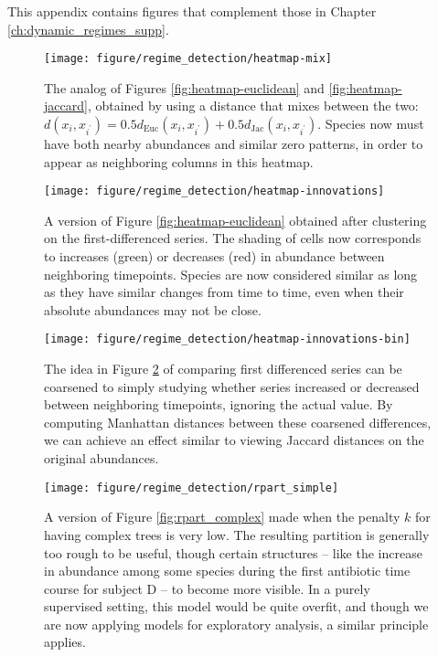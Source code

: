 This appendix contains figures that complement those in Chapter
\ref{ch:dynamic_regimes_supp}.

\begin{figure}
  \centering
  \texttt{[image: figure/regime\_detection/heatmap-mix]}
  \caption{
    The analog of Figures \ref{fig:heatmap-euclidean} and
    \ref{fig:heatmap-jaccard}, obtained by using a distance that mixes between
    the two: $d\left(x_i, x_{i^{\prime}}\right) = 0.5 d_{\text{Euc}}\left(x_{i},
    x_{i^{\prime}}\right) + 0.5d_{\text{Jac}}\left(x_{i}, x_{i^\prime}\right)$.
    Species now must have both nearby abundances and similar zero patterns, in
    order to appear as neighboring columns in this heatmap.
    \label{fig:heatmap-mix} }
\end{figure}

\begin{figure}
  \centering
  \texttt{[image: figure/regime\_detection/heatmap-innovations]}
  \caption{
    A version of Figure \ref{fig:heatmap-euclidean} obtained after clustering on
    the first-differenced series. The shading of cells now corresponds to
    increases (green) or decreases (red) in abundance between neighboring
    timepoints. Species are now considered similar as long as they have similar
    changes from time to time, even when their absolute abundances may not be
    close.
    \label{fig:heatmap-innovations} }
\end{figure}

\begin{figure}
  \centering
  \texttt{[image: figure/regime\_detection/heatmap-innovations-bin]}
  \caption{
    The idea in Figure \ref{fig:heatmap-innovations} of comparing first
    differenced series can be coarsened to simply studying whether series
    increased or decreased between neighboring timepoints, ignoring the actual
    value. By computing Manhattan distances between these coarsened differences,
    we can achieve an effect similar to viewing Jaccard distances on the
    original abundances.
    \label{fig:heatmap-innovations-bin} }
\end{figure}

\begin{figure}
  \centering
  \texttt{[image: figure/regime\_detection/rpart\_simple]}
  \caption{A version of Figure \ref{fig:rpart_complex} made when the penalty $k$
    for having complex trees is very low. The resulting partition is generally
    too rough to be useful, though certain structures -- like the increase in
    abundance among some species during the first antibiotic time course for
    subject D -- to become more visible. In a purely supervised setting, this
    model would be quite overfit, and though we are now applying models for
    exploratory analysis, a similar principle applies.
    \label{fig:rpart_simple}
  }
\end{figure}

